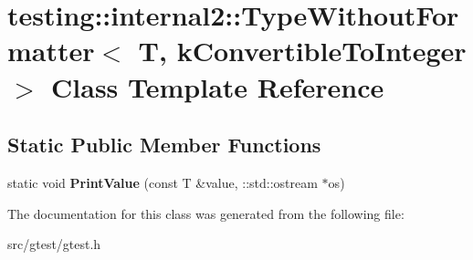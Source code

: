 \hypertarget{classtesting_1_1internal2_1_1_type_without_formatter_3_01_t_00_01k_convertible_to_integer_01_4}{}\section{testing\+:\+:internal2\+:\+:Type\+Without\+Formatter$<$ T, k\+Convertible\+To\+Integer $>$ Class Template Reference}
\label{classtesting_1_1internal2_1_1_type_without_formatter_3_01_t_00_01k_convertible_to_integer_01_4}
\subsection*{Static Public Member Functions}
\begin{DoxyCompactItemize}
\item 
\mbox{\label{classtesting_1_1internal2_1_1_type_without_formatter_3_01_t_00_01k_convertible_to_integer_01_4_ab27a411afb608e730a57d232b3f4f486}} 
static void {\bfseries Print\+Value} (const T \&value, \+::std\+::ostream $\ast$os)
\end{DoxyCompactItemize}


The documentation for this class was generated from the following file\+:\begin{DoxyCompactItemize}
\item 
src/gtest/gtest.\+h\end{DoxyCompactItemize}

